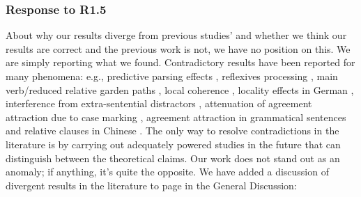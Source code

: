 \documentclass[12pt]{article}
\begin{document}
\subsubsection*{Response to R1.5}
About why our results diverge from previous studies' and whether we think our results are correct and the previous work is not, we have no position on this. We are simply reporting what we found. Contradictory results have been reported for many phenomena: e.g., predictive parsing effects \citep{nieuwland_etal_2018, Delong_etal_2005}, reflexives processing \citep{jaeger_etal_2020, dillon2013}, main verb/reduced relative garden paths \citep{trueswell1994semantic, ferreira1986independence}, local coherence \citep{lcpaape2023, taboretal04}, locality effects in German \citep{levy&keller_2013, vasishth2018_signficancefilter}, interference from extra-sentential distractors \citep{vandyke_mcelree06, mertzen_repVDM2006}, attenuation of agreement attraction due to case marking \citep{hartsuiker2001_agree, Avetisyan_etal_2020_agree}, agreement attraction in grammatical sentences \citep{wagers2009agrttr, nicenboim} and relative clauses in Chinese \citep{hsiao03, gibsonwu, VasishthetalPLoSOne2013, jaeger2015subject}. The only way to resolve contradictions in the literature is by carrying out adequately powered studies in the future that can distinguish between the theoretical claims. Our work does not stand out as an anomaly; if anything, it's quite the opposite. We have added a discussion of divergent results in the literature to page \pageref{not_an_anomaly} in the General Discussion:

\begin{quote}
\end{quote}
\end{document}
